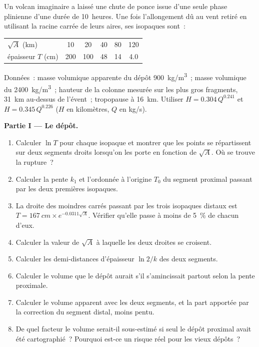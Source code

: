\begin{problem}
\label{pb:b2:eruptive-styles:1}
Un volcan imaginaire a laissé une chute de ponce issue d'une seule phase plinienne d'une durée de
\num{10}~heures. Une fois l'allongement dû au vent retiré en utilisant la racine carrée de leurs aires,
ses isopaques sont~:
\begin{center}
\small
\begin{tabular}{lccccc}
\hline
$\sqrt A$ (\unit{km}) & 10 & 20 & 40 & 80 & 120 \\
épaisseur $T$ (\unit{cm}) & 200 & 100 & 48 & 14 & 4.0 \\
\hline
\end{tabular}
\end{center}
Données~: masse volumique apparente du dépôt \qty{900}{kg/m^3}~; masse volumique du
 \qty{2400}{kg/m^3}~; hauteur de la colonne mesurée sur les plus gros fragments,
\qty{31}{km} au-dessus de l'évent~; tropopause à \qty{16}{km}. Utiliser $H =
0.304\,Q^{0.241}$ et $H = 0.345\,Q^{0.226}$ ($H$ en kilomètres, $Q$ en
\unit{kg/s}).

\medskip\noindent\textbf{Partie I --- Le dépôt.}
\begin{enumerate}
\item Calculer $\ln T$ pour chaque isopaque et montrer que les points se répartissent sur deux
segments droits lorsqu'on les porte en fonction de $\sqrt A$. Où se trouve la rupture~?
\item Calculer la pente $k_1$ et l'ordonnée à l'origine $T_0$ du segment proximal passant par les
deux premières isopaques.
\item La droite des moindres carrés passant par les trois isopaques distaux est $T =
\qty{167}{cm}\times e^{-0.0311\sqrt A}$. Vérifier qu'elle passe à moins de
\qty{5}{\percent} de chacun d'eux.
\item Calculer la valeur de $\sqrt A$ à laquelle les deux droites se croisent.
\item Calculer les demi-distances d'épaisseur $\ln 2/k$ des deux segments.
\item Calculer le volume que le dépôt aurait s'il s'amincissait partout selon la pente
proximale.
\item Calculer le volume apparent avec les deux segments, et la part apportée par la correction
du segment distal, moins pentu.
\item De quel facteur le volume serait-il sous-estimé si seul le dépôt proximal avait été cartographié~?
Pourquoi est-ce un risque réel pour les vieux dépôts~?
\end{enumerate}


\end{problem}
